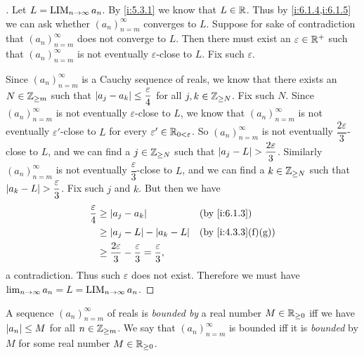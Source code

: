 \begin{proof}[]
  Let \(L = \operatorname*{LIM}_{n \to \infty} a_n\).
  By \cref{i:5.3.1} we know that \(L \in \mathbb{R}\).
  Thus by \cref{i:6.1.4,i:6.1.5} we can ask whether \((a_n)_{n = m}^\infty\) converges to \(L\).
  Suppose for sake of contradiction that \((a_n)_{n = m}^\infty\) does not converge to \(L\).
  Then there must exist an \(\varepsilon \in \mathbb{R}^+\) such that \((a_n)_{n = m}^\infty\) is not eventually \(\varepsilon\)-close to \(L\).
  Fix such \(\varepsilon\).

  Since \((a_n)_{n = m}^\infty\) is a Cauchy sequence of reals, we know that there exists an \(N \in \mathbb{Z}_{\geq m}\) such that \(\left\lvert a_j - a_k\right\rvert \leq \dfrac{\varepsilon}{4}\) for all \(j, k \in \mathbb{Z}_{\geq N}\).
  Fix such \(N\).
  Since \((a_n)_{n = m}^\infty\) is not eventually \(\varepsilon\)-close to \(L\), we know that \((a_n)_{n = m}^\infty\) is not eventually \(\varepsilon'\)-close to \(L\) for every \(\varepsilon' \in \mathbb{R}_{0 < \varepsilon}\).
  So \((a_n)_{n = m}^\infty\) is not eventually \(\dfrac{2 \varepsilon}{3}\)-close to \(L\), and we can find a \(j \in \mathbb{Z}_{\geq N}\) such that \(\left\lvert a_j - L\right\rvert > \dfrac{2 \varepsilon}{3}\).
  Similarly \((a_n)_{n = m}^\infty\) is not eventually \(\dfrac{\varepsilon}{3}\)-close to \(L\), and we can find a \(k \in \mathbb{Z}_{\geq N}\) such that \(\left\lvert a_k - L\right\rvert > \dfrac{\varepsilon}{3}\).
  Fix such \(j\) and \(k\).
  But then we have
  \begin{align*}
    \dfrac{\varepsilon}{4} & \geq \abs{a_j - a_k}                                                             &  & \by{i:6.1.3}      \\
                           & \geq \abs{a_j - L} - \abs{a_k - L}                                               &  & \by{i:4.3.3}[f,g] \\
                           & \geq \dfrac{2 \varepsilon}{3} - \dfrac{\varepsilon}{3} = \dfrac{\varepsilon}{3},
  \end{align*}
  a contradiction.
  Thus such \(\varepsilon\) does not exist.
  Therefore we must have \(\lim_{n \to \infty} a_n = L = \operatorname*{LIM}_{n \to \infty} a_n\).
\end{proof}

\begin{defn}\label{i:6.1.16}
  A sequence \((a_n)_{n = m}^\infty\) of reals is \emph{bounded by} a real number \(M \in \mathbb{R}_{\geq 0}\) iff we have \(\left\lvert a_n\right\rvert \leq M\) for all \(n \in \mathbb{Z}_{\geq m}\).
  We say that \((a_n)_{n = m}^\infty\) is bounded iff it is \emph{bounded} by \(M\) for some real number \(M \in \mathbb{R}_{\geq 0}\).
\end{defn}

